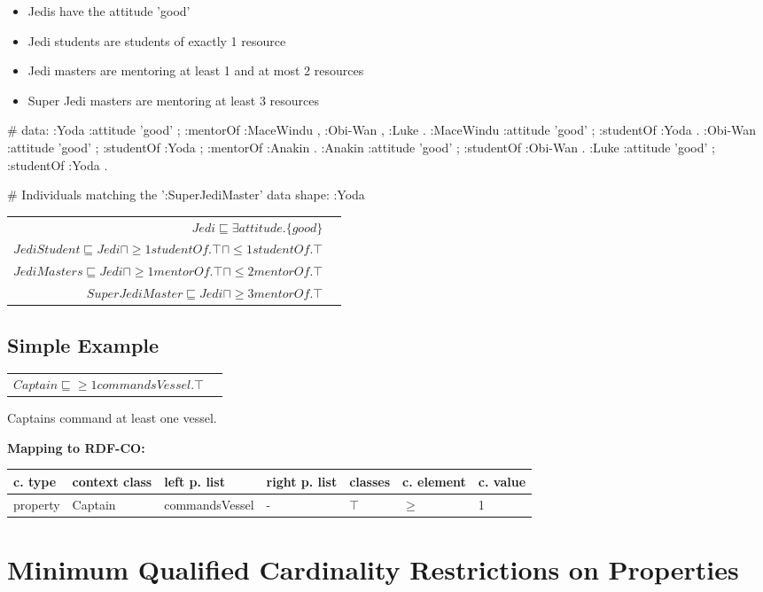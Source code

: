 \documentclass{llncs}
\newenvironment{gcotable}{
  \scriptsize
  \sffamily
  \vspace{0cm}
	\begin{center}
	\textbf{\vspace{0.4cm}Mapping to RDF-CO:} \\
  \begin{tabular}{l|l|l|l|l|l|l}
	\hline
  \textbf{c. type} & \textbf{context class} & \textbf{left p. list} & \textbf{right p. list} & \textbf{classes} & \textbf{c. element} & \textbf{c. value} \\
  \hline

}{
  \hline
  \end{tabular}
	\end{center}
}
\newenvironment{DL}{
  \vspace{0cm}
	\begin{center}
  \begin{tabular}{r l}

}{
  \end{tabular}
	\end{center}
}
\begin{document}
\begin{itemize}
	\item Jedis have the attitude 'good'
	\item Jedi students are students of exactly 1 resource
	\item Jedi masters are mentoring at least 1 and at most 2 resources
	\item Super Jedi masters are mentoring at least 3 resources  
\end{itemize}

\begin{ex}
# data:
:Yoda 
    :attitude 'good' ;
    :mentorOf :MaceWindu , :Obi-Wan , :Luke .
:MaceWindu
    :attitude 'good' ;
    :studentOf :Yoda .
:Obi-Wan 
    :attitude 'good' ;
    :studentOf :Yoda ;
    :mentorOf :Anakin .
:Anakin
    :attitude 'good' ; 
    :studentOf :Obi-Wan .
:Luke
    :attitude 'good' ;
    :studentOf :Yoda .
\end{ex}

\begin{ex}
# Individuals matching the ’:SuperJediMaster’ data shape:
:Yoda 
\end{ex}

\begin{DL}
$Jedi \sqsubseteq \exists attitude.\{good\} $\\
$JediStudent \sqsubseteq Jedi \sqcap \geq1 studentOf.\top \sqcap \leq1 studentOf.\top$ \\
$JediMasters \sqsubseteq Jedi \sqcap \geq1 mentorOf.\top \sqcap \leq2 mentorOf.\top $\\
$SuperJediMaster \sqsubseteq Jedi \sqcap  \geq3 mentorOf.\top $
\end{DL}

\subsection{Simple Example}

\begin{DL}
$Captain \sqsubseteq \geq1 commandsVessel.\top $
\end{DL}

Captains command at least one vessel.

\begin{gcotable}
property & Captain & commandsVessel & - & $\top$ & $\geq$ & 1 \\
\end{gcotable}

\section{Minimum Qualified Cardinality Restrictions on Properties}
\end{document}

